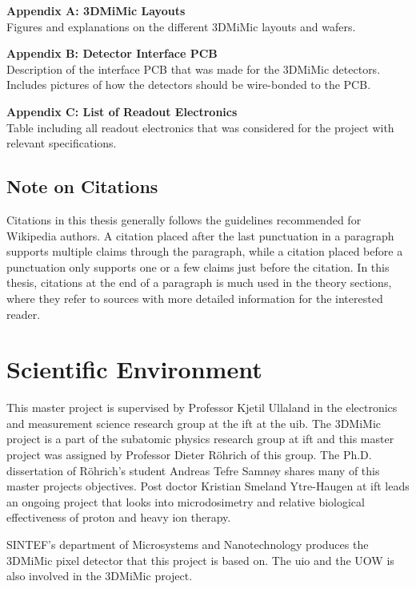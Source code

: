 \documentclass[../main/thesis.tex]{subfiles}
\begin{document}
\textbf{Appendix A: 3DMiMic Layouts}\\
Figures and explanations on the different 3DMiMic layouts and wafers. 

\textbf{Appendix B: Detector Interface PCB}\\
Description of the interface PCB that was made for the 3DMiMic detectors. Includes pictures of how the detectors should be wire-bonded to the PCB. 

\textbf{Appendix C: List of Readout Electronics}\\
Table including all readout electronics that was considered for the project with relevant specifications. 

\subsection{Note on Citations}
Citations in this thesis generally follows the guidelines recommended for Wikipedia authors. A citation placed after the last punctuation in a paragraph supports multiple claims through the paragraph, while a citation placed before a punctuation only supports one or a few claims just before the citation. In this thesis, citations at the end of a paragraph is much used in the theory sections, where they refer to sources with more detailed information for the interested reader.

\section{Scientific Environment}
\label{i-environment}
This master project is supervised by Professor Kjetil Ullaland in the electronics and measurement science research group at the \gls{ift} at the \gls{uib}. The 3DMiMic project is a part of the subatomic physics research group at \gls{ift} and this master project was assigned by Professor Dieter Röhrich of this group. The Ph.D. dissertation of Röhrich's student Andreas Tefre Samnøy shares many of this master projects objectives. Post doctor Kristian Smeland Ytre-Haugen at \gls{ift} leads an ongoing project that looks into microdosimetry and relative biological effectiveness of proton and heavy ion therapy. 

SINTEF's department of Microsystems and Nanotechnology produces the 3DMiMic pixel detector that this project is based on. The \gls{uio} and the \gls{UOW} is also involved in the 3DMiMic project. 

\end{document}
